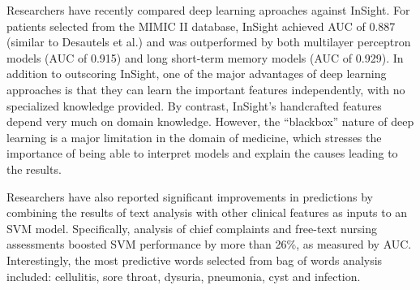 \documentclass{amia}
\begin{document}
	 Researchers have recently 
	compared deep learning aproaches against InSight.\cite{kam2017}
	 For patients selected from the MIMIC II database, InSight
	achieved AUC of 0.887 (similar to Desautels et al.) and was
	outperformed by both multilayer perceptron models (AUC of 0.915) 
        and long short-term memory models (AUC of
	0.929).  
	 In addition to outscoring InSight, one of the major
	advantages of deep learning approaches is that they can
	learn the important features independently, with no specialized
	knowledge provided.  
	 By contrast, InSight's handcrafted features depend very much 
	on domain knowledge.  
	 However, the ``blackbox'' nature of
	deep learning is a major limitation in the domain of medicine,
	which stresses the importance of being able to interpret
	models and explain the causes leading to the results.\cite{kam2017}

	Researchers have also reported significant improvements
        in predictions by combining 
	the results of text analysis with other clinical features
	as inputs to an SVM model.\cite{horng2017}  
	Specifically, analysis of chief complaints 
	and free-text nursing assessments boosted SVM performance
        by more than 26\%, as measured by AUC.
	Interestingly, the most predictive words selected from bag of words 
	analysis included: cellulitis, sore throat, dysuria, pneumonia, 
	cyst and infection.  
\end{document}
